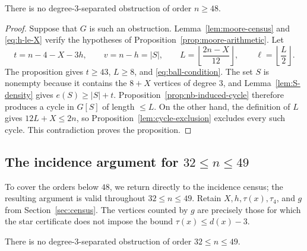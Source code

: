 \begin{proposition}
\label{prop:no-obstruction-ge48}
There is no degree-\(3\)-separated obstruction of order \(n\ge48\).
\end{proposition}

\begin{proof}
Suppose that \(G\) is such an obstruction.  Lemma~\ref{lem:moore-census}
and \eqref{eq:h-le-X} verify the hypotheses of
Proposition~\ref{prop:moore-arithmetic}.  Let
\[
  t=n-4-X-3h,\qquad
  v=n-h=|S|,\qquad
  L=\left\lfloor\frac{2n-X}{12}\right\rfloor,\qquad
  \ell=\left\lfloor\frac L2\right\rfloor.
\]
The proposition gives \(t\ge43\), \(L\ge8\), and
\eqref{eq:ball-condition}.  The set \(S\) is nonempty because it contains
the \(8+X\) vertices of degree \(3\), and Lemma~\ref{lem:S-density} gives
\(e(S)\ge|S|+t\).  Proposition~\ref{prop:nb-induced-cycle} therefore
produces a cycle in \(G[S]\) of length \(\le L\).  On the other hand, the
definition of \(L\) gives \(12L+X\le2n\), so
Proposition~\ref{lem:cycle-exclusion} excludes every such cycle.
This contradiction proves the proposition.
\end{proof}

\subsection{The incidence argument for
\texorpdfstring{\(32\le n\le49\)}{32 <= n <= 49}}

To cover the orders below \(48\), we return directly to the incidence census;
the resulting argument is valid throughout \(32\le n\le49\).  Retain
\(X,h,\tau(x),\tau_4\), and \(g\) from Section~\ref{sec:census}.  The vertices
counted by \(g\) are precisely those for which the star certificate does not
impose the bound \(\tau(x)\le d(x)-3\).

\begin{proposition}
\label{prop:incidence-capacity-contradiction}
There is no degree-\(3\)-separated obstruction of order
\(32\le n\le49\).
\end{proposition}

